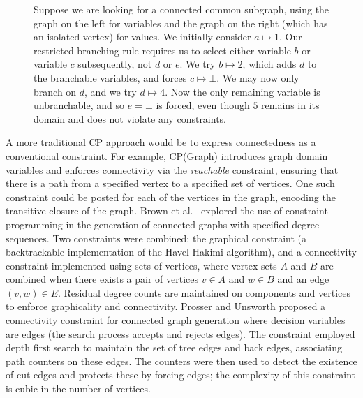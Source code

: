 \documentclass{llncs}
\begin{document}
\begin{figure}[tb]

    \caption{Suppose we are looking for a connected common subgraph, using the graph on the left
        for variables and the graph on the right (which has an isolated vertex) for values. We
        initially consider $a \mapsto 1$. Our restricted branching rule requires us to select either variable
        $b$ or variable $c$ subsequently, not $d$ or $e$. We try $b \mapsto 2$, which adds $d$
        to the branchable variables, and forces $c \mapsto \bot$. We may now only branch on $d$, and
        we try $d \mapsto 4$. Now the only remaining variable is unbranchable, and so $e = \bot$ is forced, even
        though $5$ remains in its domain and does not violate any constraints.}\label{figure:restricted}
\end{figure}

A more traditional CP approach would be to express connectedness as a conventional constraint. For
example, CP(Graph) \cite{DBLP:conf/cp/DoomsDD05} introduces graph domain variables and enforces
connectivity via the \emph{reachable} constraint, ensuring that there is a path from a specified
vertex to a specified set of vertices. One such constraint could be posted for each of the vertices
in the graph, encoding the transitive closure of the graph. Brown et al.\ \cite{Brown:2005}
explored the use of constraint programming in the generation of connected graphs with specified
degree sequences.  Two constraints were combined: the graphical constraint (a backtrackable
implementation of the Havel-Hakimi algorithm), and a connectivity constraint implemented using sets
of vertices, where vertex sets $A$ and $B$ are combined when there exists a pair of vertices $v \in
A$ and $w \in B$ and an edge $(v,w) \in E$. Residual degree counts are maintained on components and
vertices to enforce graphicality and connectivity. Prosser and Unsworth
\cite{DBLP:conf/ecai/ProsserU06} proposed a connectivity constraint for connected graph generation
where decision variables are edges (the search process accepts and rejects edges). The constraint
employed depth first search to maintain the set of tree edges and back edges, associating path
counters on these edges. The counters were then used to detect the existence of cut-edges and
protects these by forcing edges; the complexity of this constraint is cubic in the number of
vertices.
\end{document}
